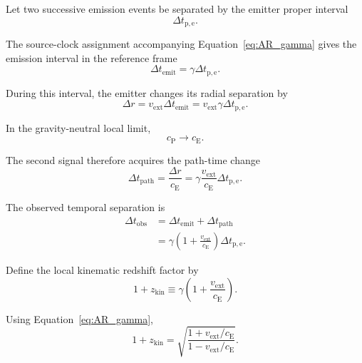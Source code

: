 Let two successive emission events be separated by the emitter proper interval
\begin{equation}
    \Delta t_{\mathrm{p,e}}.
\end{equation}

The source-clock assignment accompanying
Equation~\eqref{eq:AR_gamma} gives the emission interval in the reference frame
\begin{equation}
    \Delta t_{\mathrm{emit}}
    =
    \gamma
    \Delta t_{\mathrm{p,e}}.
    \label{eq:AR_temitter}
\end{equation}

During this interval, the emitter changes its radial separation by
\begin{equation}
    \Delta r
    =
    v_{\mathrm{ext}}
    \Delta t_{\mathrm{emit}}
    =
    v_{\mathrm{ext}}
    \gamma
    \Delta t_{\mathrm{p,e}}.
    \label{eq:AR_dr_emit}
\end{equation}

In the gravity-neutral local limit,
\begin{equation}
    c_{\mathrm P}
    \rightarrow
    c_{\mathrm E}.
\end{equation}

The second signal therefore acquires the path-time change
\begin{equation}
    \Delta t_{\mathrm{path}}
    =
    \frac{\Delta r}{c_{\mathrm E}}
    =
    \gamma
    \frac{v_{\mathrm{ext}}}{c_{\mathrm E}}
    \Delta t_{\mathrm{p,e}}.
    \label{eq:AR_path_delay}
\end{equation}

The observed temporal separation is
\begin{align}
    \Delta t_{\mathrm{obs}}
    &=
    \Delta t_{\mathrm{emit}}
    +
    \Delta t_{\mathrm{path}}
    \\
    &=
    \gamma
    \left(
        1+\frac{v_{\mathrm{ext}}}{c_{\mathrm E}}
    \right)
    \Delta t_{\mathrm{p,e}}.
    \label{eq:AR_time_kin}
\end{align}

Define the local kinematic redshift factor by
\begin{equation}
    \boxed{
    1+z_{\mathrm{kin}}
    \equiv
    \gamma
    \left(
        1+\frac{v_{\mathrm{ext}}}{c_{\mathrm E}}
    \right).
    }
    \label{eq:AR_zkin}
\end{equation}

Using Equation~\eqref{eq:AR_gamma},
\begin{equation}
    \boxed{
    1+z_{\mathrm{kin}}
    =
    \sqrt{
        \frac{
            1+v_{\mathrm{ext}}/c_{\mathrm E}
        }{
            1-v_{\mathrm{ext}}/c_{\mathrm E}
        }
    }.
    }
    \label{eq:AR_zkin_Doppler}
\end{equation}

